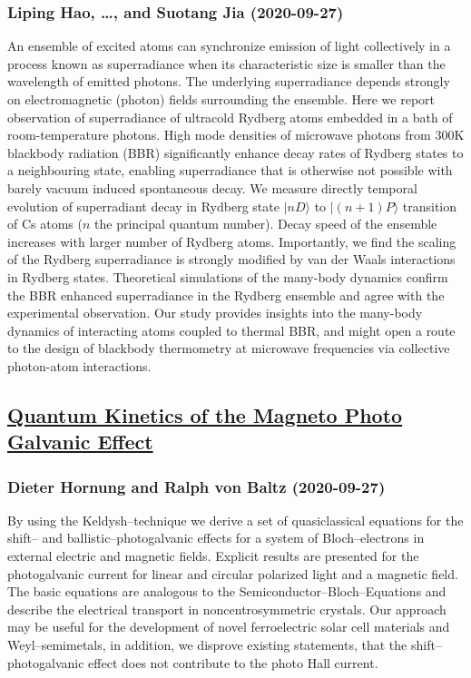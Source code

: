\subsubsection*{Liping Hao, \dots, and Suotang Jia (2020-09-27)}
An ensemble of excited atoms can synchronize emission of light collectively
in a process known as superradiance when its characteristic size is smaller
than the wavelength of emitted photons. The underlying superradiance depends
strongly on electromagnetic (photon) fields surrounding the ensemble. Here we
report observation of superradiance of ultracold Rydberg atoms embedded in a
bath of room-temperature photons. High mode densities of microwave photons from
$300$K blackbody radiation (BBR) significantly enhance decay rates of Rydberg
states to a neighbouring state, enabling superradiance that is otherwise not
possible with barely vacuum induced spontaneous decay. We measure directly
temporal evolution of superradiant decay in Rydberg state $|nD\rangle$ to
$|(n+1)P\rangle$ transition of Cs atoms ($n$ the principal quantum number).
Decay speed of the ensemble increases with larger number of Rydberg atoms.
Importantly, we find the scaling of the Rydberg superradiance is strongly
modified by van der Waals interactions in Rydberg states. Theoretical
simulations of the many-body dynamics confirm the BBR enhanced superradiance in
the Rydberg ensemble and agree with the experimental observation. Our study
provides insights into the many-body dynamics of interacting atoms coupled to
thermal BBR, and might open a route to the design of blackbody thermometry at
microwave frequencies via collective photon-atom interactions.

\subsection*{\href{http://arxiv.org/abs/2009.12859v1}{Quantum Kinetics of the Magneto Photo Galvanic Effect}}
\subsubsection*{Dieter Hornung and Ralph von Baltz (2020-09-27)}
By using the Keldysh--technique we derive a set of quasiclassical equations
for the shift-- and ballistic--photogalvanic effects for a system of
Bloch--electrons in external electric and magnetic fields. Explicit results are
presented for the photogalvanic current for linear and circular polarized light
and a magnetic field. The basic equations are analogous to the
Semiconductor--Bloch--Equations and describe the electrical transport in
noncentrosymmetric crystals. Our approach may be useful for the development of
novel ferroelectric solar cell materials and Weyl--semimetals, in addition, we
disprove existing statements, that the shift--photogalvanic effect does not
contribute to the photo Hall current.

